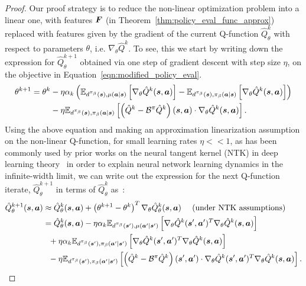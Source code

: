 \begin{proof} Our proof strategy is to reduce the non-linear optimization problem into a linear one, with features $\boldsymbol{F}$ (in Theorem~\ref{thm:policy_eval_func_approx}) replaced with features given by the gradient of the current Q-function $\hat{Q}^{k}_\theta$ with respect to parameters $\theta$, i.e. $\nabla_\theta \hat{Q}^k$. To see, this we start by writing down the expression for $\hat{Q}^{k+1}_\theta$ obtained via one step of gradient descent with step size $\eta$, on the objective in Equation~\ref{eqn:modified_policy_eval}.
\begin{align*}
    \theta^{k+1} = \theta^k &- \eta \alpha_k \left( \mathbb{E}_{d^{\pi_\beta}(\boldsymbol{s}), \mu(\boldsymbol{a}|\boldsymbol{s})}\left[\nabla_\theta \hat{Q}^{k}(\boldsymbol{s}, \boldsymbol{a})\right] - \mathbb{E}_{d^{\pi_\beta}(\boldsymbol{s}), {\pi_\beta}(\boldsymbol{a}|\boldsymbol{s})}\left[\nabla_\theta \hat{Q}^{k}(\boldsymbol{s}, \boldsymbol{a})\right] \right) \\ 
    &- \eta \mathbb{E}_{d^{\pi_\beta}(\boldsymbol{s}), {\pi_\beta}(\boldsymbol{a}|\boldsymbol{s})}\left[ \left(\hat{Q}^k - \mathcal{B}^\pi \hat{Q}^{k} \right)(\boldsymbol{s}, \boldsymbol{a}) \cdot \nabla_\theta \hat{Q}^{k}(\boldsymbol{s}, \boldsymbol{a}) \right].
\end{align*}
Using the above equation and making an approximation linearization assumption on the non-linear Q-function, for small learning rates $\eta << 1$, as has been commonly used by prior works on the neural tangent kernel (NTK) in deep learning theory~\citep{ntk} in order to explain neural network learning dynamics in the infinite-width limit, we can write out the expression for the next Q-function iterate, $\hat{Q}^{k+1}_\theta$ in terms of $\hat{Q}^k_\theta$ as~\citep{achiam2019towards,ntk}:
\begin{align*}
    \hat{Q}^{k+1}_\theta(\bs, \mathbf{a}) &\approx \hat{Q}^k_\theta(\bs, \mathbf{a}) + \left(\theta^{k+1} - \theta^{k}\right)^T \nabla_\theta \hat{Q}^{k}_\theta (\bs, \mathbf{a}) ~~~~ \text{(under NTK assumptions)}\\
    &= \hat{Q}^k_\theta(\bs, \mathbf{a}) - \eta \alpha_k \E_{d^\behavior(\bs'), \mu(\mathbf{a}'|\bs')}\left[\nabla_\theta \hat{Q}^{k}(\bs', \mathbf{a}')^T \nabla_\theta \hat{Q}^{k}(\bs, \mathbf{a}) \right]\\
    &~~ + \eta \alpha_k \E_{d^\behavior(\bs'), \behavior(\mathbf{a}'|\bs')}\left[\nabla_\theta \hat{Q}^{k}(\bs', \mathbf{a}')^T \nabla_\theta \hat{Q}^k(\bs, \mathbf{a}) \right]\\
    &~~ - \eta \E_{d^\behavior(\bs'), \behavior(\mathbf{a}'|\bs')}\left[ \left(\hat{Q}^k - \bellman^\policy \hat{Q}^{k} \right)(\bs', \mathbf{a}') \cdot \nabla_\theta \hat{Q}^{k}(\bs', \mathbf{a}')^T \nabla_\theta \hat{Q}^k(\bs, \mathbf{a}) \right].

\end{align*}
\end{proof}
